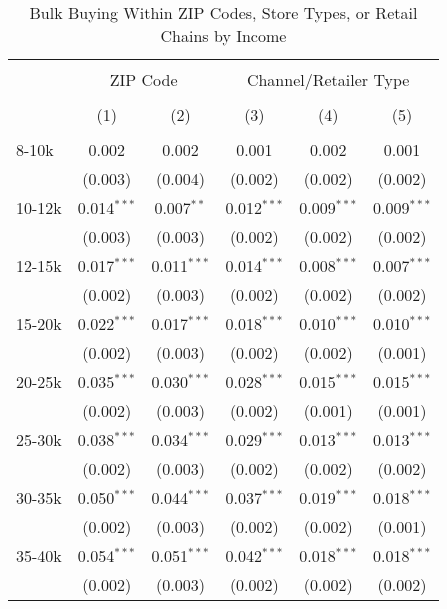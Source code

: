 
\begin{table}[!htbp] \centering 
  \caption{Bulk Buying Within ZIP Codes, Store Types, or Retail Chains by Income} 
  \label{tab:discountingBehaviorFEAll} 
\begin{tabular}{@{\extracolsep{5pt}}lccccc} 
\\[-1.8ex]\hline 
\hline \\[-1.8ex] 
 & \multicolumn{2}{c}{ZIP Code} & \multicolumn{3}{c}{Channel/Retailer Type} \\ 
\\[-1.8ex] & (1) & (2) & (3) & (4) & (5)\\ 
\hline \\[-1.8ex] 
 8-10k & 0.002 & 0.002 & 0.001 & 0.002 & 0.001 \\ 
  & (0.003) & (0.004) & (0.002) & (0.002) & (0.002) \\ 
  10-12k & 0.014$^{***}$ & 0.007$^{**}$ & 0.012$^{***}$ & 0.009$^{***}$ & 0.009$^{***}$ \\ 
  & (0.003) & (0.003) & (0.002) & (0.002) & (0.002) \\ 
  12-15k & 0.017$^{***}$ & 0.011$^{***}$ & 0.014$^{***}$ & 0.008$^{***}$ & 0.007$^{***}$ \\ 
  & (0.002) & (0.003) & (0.002) & (0.002) & (0.002) \\ 
  15-20k & 0.022$^{***}$ & 0.017$^{***}$ & 0.018$^{***}$ & 0.010$^{***}$ & 0.010$^{***}$ \\ 
  & (0.002) & (0.003) & (0.002) & (0.002) & (0.001) \\ 
  20-25k & 0.035$^{***}$ & 0.030$^{***}$ & 0.028$^{***}$ & 0.015$^{***}$ & 0.015$^{***}$ \\ 
  & (0.002) & (0.003) & (0.002) & (0.001) & (0.001) \\ 
  25-30k & 0.038$^{***}$ & 0.034$^{***}$ & 0.029$^{***}$ & 0.013$^{***}$ & 0.013$^{***}$ \\ 
  & (0.002) & (0.003) & (0.002) & (0.002) & (0.002) \\ 
  30-35k & 0.050$^{***}$ & 0.044$^{***}$ & 0.037$^{***}$ & 0.019$^{***}$ & 0.018$^{***}$ \\ 
  & (0.002) & (0.003) & (0.002) & (0.002) & (0.001) \\ 
  35-40k & 0.054$^{***}$ & 0.051$^{***}$ & 0.042$^{***}$ & 0.018$^{***}$ & 0.018$^{***}$ \\ 
  & (0.002) & (0.003) & (0.002) & (0.002) & (0.002) \\ 

\end{tabular}
\end{table}
